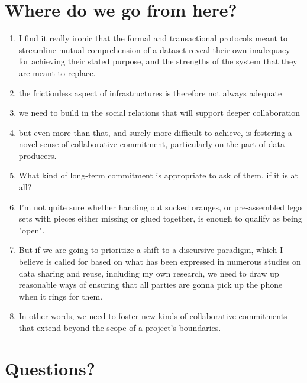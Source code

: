 \documentclass[12pt]{article}
\begin{document}
\section{Where do we go from here?}
\begin{enumerate}
  \item I find it really ironic that the formal and transactional protocols meant to streamline mutual comprehension of a dataset reveal their own inadequacy for achieving their stated purpose, and the strengths of the system that they are meant to replace.
  \item the frictionless aspect of infrastructures is therefore not always adequate
  \item we need to build in the social relations that will support deeper collaboration
  \item but even more than that, and surely more difficult to achieve, is fostering a novel sense of collaborative commitment, particularly on the part of data producers.
  \item What kind of long-term commitment is appropriate to ask of them, if it is at all?
  \item I'm not quite sure whether handing out sucked oranges, or pre-assembled lego sets with pieces either missing or glued together, is enough to qualify as being "open".
  \item But if we are going to prioritize a shift to a discursive paradigm, which I believe is called for based on what has been expressed in numerous studies on data sharing and reuse, including my own research, we need to draw up reasonable ways of ensuring that all parties are gonna pick up the phone when it rings for them.
  \item In other words, we need to foster new kinds of collaborative commitments that extend beyond the scope of a project's boundaries.
\end{enumerate}


\section{Questions?}
\end{document}
